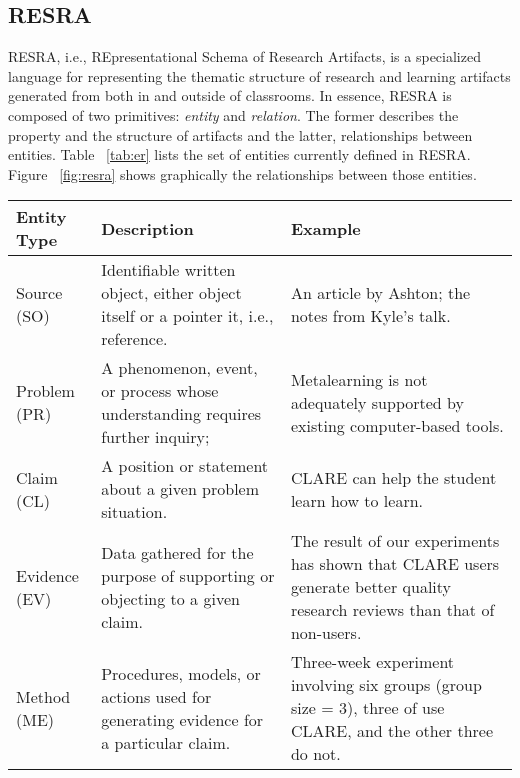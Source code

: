 \subsection{RESRA}
\label{sec:resra1}

RESRA, i.e., REpresentational Schema of Research Artifacts, is a
specialized language for representing the thematic structure of research
and learning artifacts generated from both in and outside of classrooms. In
essence, RESRA is composed of two primitives: {\it entity\/} and {\it
relation\/}. The former describes the property and the structure of
artifacts and the latter, relationships between entities. Table
~\ref{tab:er} lists the set of entities currently defined in RESRA.  Figure
~\ref{fig:resra} shows graphically the relationships between those
entities. 

{\small
\begin{table}[hbt]
  \begin{center}
    \begin{tabular} {|l|p{2.25in}|p{2.25in}|} \hline   
      {\bf Entity Type} & {\bf Description} & {\bf Example} \\ \hline
      
      Source (SO) & Identifiable written object, either object itself or
a pointer it, i.e., reference. & An article by Ashton; the notes from
Kyle's talk. \\ \hline
      
      Problem (PR) & A phenomenon, event, or process whose understanding
requires further inquiry; & Metalearning is not adequately supported by
existing computer-based tools. \\ \hline
      
      Claim (CL) & A position or statement about a given problem situation.
& CLARE can help the student learn how to learn. \\ \hline
      
      Evidence (EV) & Data gathered for the purpose of supporting or
objecting to a given claim. & The result of our experiments has shown that
CLARE users generate better quality research reviews than that of
non-users. \\ \hline
      
      Method (ME) & Procedures, models, or actions used for generating
evidence for a particular claim. & Three-week experiment involving six
groups (group size = 3), three of use CLARE, and the other three do not. \\
\hline
      

\end{tabular}
\end{center}
\end{table}}
